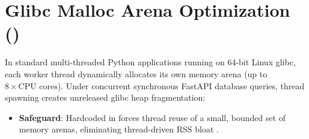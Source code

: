 \section{Glibc Malloc Arena Optimization ()}
In standard multi-threaded Python applications running on 64-bit Linux glibc, each worker thread dynamically allocates its own memory arena (up to $8 \times \text{CPU cores}$). Under concurrent synchronous FastAPI database queries, thread spawning creates unreleased glibc heap fragmentation:
\begin{itemize}[leftmargin=6mm,itemsep=1.5mm]
    \item \textbf{Safeguard}: Hardcoded  in  forces thread reuse of a small, bounded set of memory arenas, eliminating thread-driven RSS bloat .
\end{itemize}
